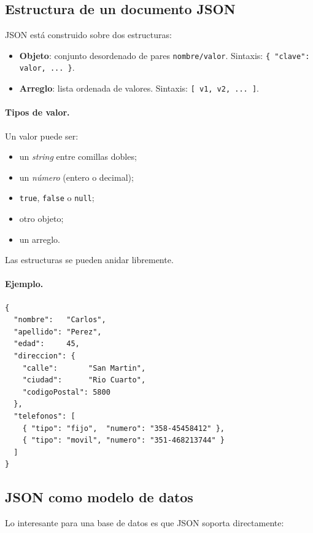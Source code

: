 \documentclass[11pt,a4paper]{article}
\begin{document}
\subsection{Estructura de un documento JSON}

JSON está construido sobre dos estructuras:

\begin{itemize}
    \item \textbf{Objeto}: conjunto desordenado de pares
    \texttt{nombre/valor}. Sintaxis: \texttt{\{ "clave": valor, ... \}}.
    \item \textbf{Arreglo}: lista ordenada de valores. Sintaxis:
    \texttt{[ v1, v2, ... ]}.
\end{itemize}

\paragraph{Tipos de valor.} Un valor puede ser:
\begin{itemize}
    \item un \emph{string} entre comillas dobles;
    \item un \emph{número} (entero o decimal);
    \item \texttt{true}, \texttt{false} o \texttt{null};
    \item otro objeto;
    \item un arreglo.
\end{itemize}

Las estructuras se pueden anidar libremente.

\paragraph{Ejemplo.}

\begin{lstlisting}
{
  "nombre":   "Carlos",
  "apellido": "Perez",
  "edad":     45,
  "direccion": {
    "calle":       "San Martin",
    "ciudad":      "Rio Cuarto",
    "codigoPostal": 5800
  },
  "telefonos": [
    { "tipo": "fijo",  "numero": "358-45458412" },
    { "tipo": "movil", "numero": "351-468213744" }
  ]
}
\end{lstlisting}

\subsection{JSON como modelo de datos}

Lo interesante para una base de datos es que JSON soporta directamente:
\end{document}
